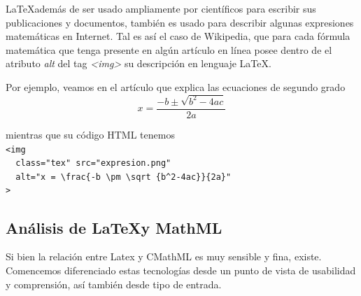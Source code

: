 \LaTeX además de ser usado ampliamente por científicos para escribir sus publicaciones y documentos, también es usado para describir
algunas expresiones matemáticas en Internet. Tal es así el caso de Wikipedia, que para cada fórmula matemática que tenga presente en algún artículo en línea posee dentro de el atributo \textit{alt} del tag \textit{<img>}
su descripción en lenguaje \LaTeX.

Por ejemplo, veamos en el artículo que explica las ecuaciones de segundo grado %
$$x = \frac{-b \pm \sqrt {b^2-4ac}}{2a}$$

mientras que su código HTML tenemos
\\
\verb|<img|\\
\verb|  class="tex" src="expresion.png"|\\
\verb|  alt="x = \frac{-b \pm \sqrt {b^2-4ac}}{2a}"|\\
\verb|>|

\subsection{Análisis de \LaTeX y MathML}

Si bien la relación entre Latex y CMathML\cite{5} es muy sensible y fina, existe. Comencemos diferenciado estas tecnologías desde un punto de vista de usabilidad y comprensión, así también desde tipo de entrada.

